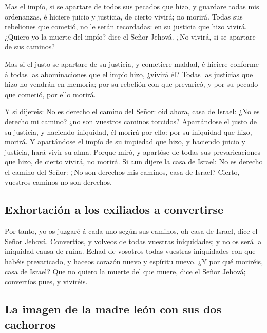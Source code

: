  Mas el impío, si se apartare de todos sus pecados que
hizo, y guardare todas mis ordenanzas, é hiciere juicio y justicia, de
cierto vivirá; no morirá.  Todas sus rebeliones que
cometió, no le serán recordadas: en su justicia que hizo vivirá.
 ¿Quiero yo la muerte del impío? dice el Señor Jehová.
¿No vivirá, si se apartare de sus caminos?

 Mas si el justo se apartare de su justicia, y cometiere
maldad, é hiciere conforme á todas las abominaciones que el impío hizo,
¿vivirá él? Todas las justicias que hizo no vendrán en memoria; por su
rebelión con que prevaricó, y por su pecado que cometió, por ello
morirá.

 Y si dijereis: No es derecho el camino del Señor: oid
ahora, casa de Israel: ¿No es derecho mi camino? ¿no son vuestros
caminos torcidos?  Apartándose el justo de su justicia, y
haciendo iniquidad, él morirá por ello: por su iniquidad que hizo,
morirá.  Y apartándose el impío de su impiedad que hizo,
y haciendo juicio y justicia, hará vivir su alma.  Porque
miró, y apartóse de todas sus prevaricaciones que hizo, de cierto
vivirá, no morirá.  Si aun dijere la casa de Israel: No
es derecho el camino del Señor: ¿No son derechos mis caminos, casa de
Israel? Cierto, vuestros caminos no son derechos.

\hypertarget{exhortaciuxf3n-a-los-exiliados-a-convertirse}{%
\subsection{Exhortación a los exiliados a
convertirse}\label{exhortaciuxf3n-a-los-exiliados-a-convertirse}}

 Por tanto, yo os juzgaré á cada uno según sus caminos,
oh casa de Israel, dice el Señor Jehová. Convertíos, y volveos de todas
vuestras iniquidades; y no os será la iniquidad causa de ruina.
 Echad de vosotros todas vuestras iniquidades con que
habéis prevaricado, y haceos corazón nuevo y espíritu nuevo. ¿Y por qué
moriréis, casa de Israel?  Que no quiero la muerte del
que muere, dice el Señor Jehová; convertíos pues, y viviréis.

\hypertarget{la-imagen-de-la-madre-leuxf3n-con-sus-dos-cachorros}{%
\subsection{La imagen de la madre león con sus dos
cachorros}\label{la-imagen-de-la-madre-leuxf3n-con-sus-dos-cachorros}}

